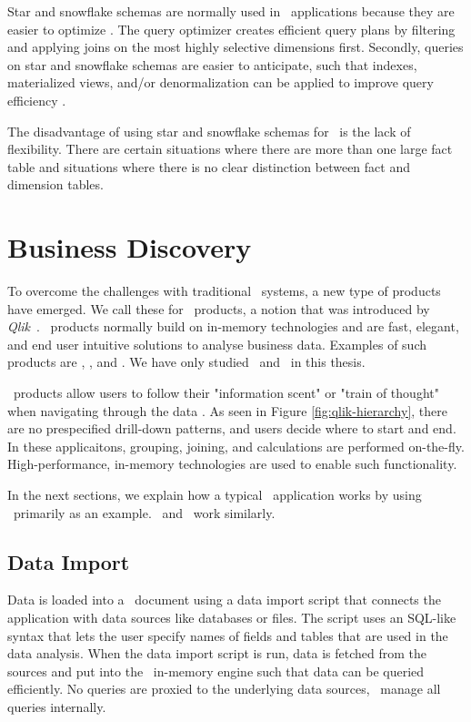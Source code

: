 Star and snowflake schemas are normally used in \bi~applications because they are easier to optimize \cite{Lamb2012-kg}. The query optimizer creates efficient query plans by filtering and applying joins on the most highly selective dimensions first. Secondly, queries on star and snowflake schemas are easier to anticipate, such that indexes, materialized views, and/or denormalization can be applied to improve query efficiency \cite{Barber2012-xt}.

The disadvantage of using star and snowflake schemas for \bi~is the lack of flexibility. There are certain situations where there are more than one large fact table and situations where there is no clear distinction between fact and dimension tables.

\section{Business Discovery}
\label{sec:Business Discovery}

To overcome the challenges with traditional \bi~systems, a new type of products have emerged. We call these for \bd~products, a notion that was introduced by \textit{Qlik}~\cite{Qlik2014-vd}. \bd~products normally build on in-memory technologies and are fast, elegant, and end user intuitive solutions to analyse business data. Examples of such products are \powerpivot, \tableau, and \qlikview. We have only studied \qlikview~and \tableau~in this thesis.


\bd~products allow users to follow their "information scent" or "train of thought" when navigating through the data \cite{Kamkolkar2015-iq, Qlik2014-vd}. As seen in Figure \ref{fig:qlik-hierarchy}, there are no prespecified drill-down patterns, and users decide where to start and end. In these applicaitons, grouping, joining, and calculations are performed on-the-fly. High-performance, in-memory technologies are used to enable such functionality. 

In the next sections, we explain how a typical \bd~application works by using \qlikview~primarily as an example. \tableau~and \powerpivot~work similarly.

\subsection{Data Import}
\label{sub:Data Import}
Data is loaded into a \qlikview~document using a data import script that connects the application with data sources like databases or files. The script uses an SQL-like syntax that lets the user specify names of fields and tables that are used in the data analysis. When the data import script is run, data is fetched from the sources and put into the \qlikview~in-memory engine such that data can be queried efficiently. No queries are proxied to the underlying data sources, \qlikview~manage all queries internally.

